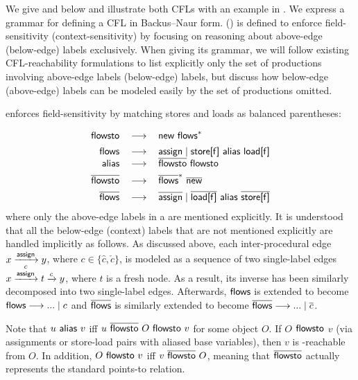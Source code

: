 We give \manuLF and \manuLC below  and illustrate both CFLs with an example in
. We express a
grammar for defining a CFL
in Backus–Naur form. 
\manuLF (\manuLC) is defined to enforce field-sensitivity (context-sensitivity)
by focusing on
reasoning about  above-edge
(below-edge) labels exclusively. When giving its grammar, we will follow  
existing 
CFL-reachability formulations 
\cite{sridharan2006refinement,shang2012demand,yan2011demand} to 
list explicitly only  the set of
productions involving 
 above-edge labels (below-edge) labels, but discuss
 how  below-edge (above-edge) labels can be modeled easily by  
 the set of productions omitted.

\manuLF 
enforces field-sensitivity   by matching  stores and loads 
 as  balanced parentheses:

\begin{equation}
\label{eqn:callsiteLF}
\begin{tabular}{rcl}
$\flowsto$ & $\longrightarrow$ & $\new ~ \flows^*$ \\[1ex]
$\flows$ & $\longrightarrow$ & $\assign \mid  \storefield{f} \ \alias \ \loadfield{f}$\\
$\alias$ & $\longrightarrow$ & $\iflowsto\ \flowsto$ \\[1ex]
$\iflowsto$ & $\longrightarrow$ & $\iflows^* ~ \inew $\\[1ex]
$\iflows$ & $\longrightarrow$ & $\iassign \mid \iloadfield{f}\ \alias \ \istorefield{f} $
\end{tabular}
\end{equation}
where only the above-edge labels in a  \pag are mentioned explicitly. It is
understood that
all the below-edge (context) labels that are not mentioned explicitly
are handled implicitly as follows.
As discussed above, each inter-procedural \assign edge
$x\xrightarrow[c]{\textsf{assign}}y$, where $c\in \{
\hat{c}, \check{c}\}$, is modeled as a sequence of  two single-label edges
$x \xrightarrow{\textsf{assign}} t \xrightarrow{c}  y$, where $t$ is a fresh node. As a result,
its inverse has been
similarly
decomposed into two
single-label edges.
Afterwards,  $\textsf{flows}$ is extended to become $\textsf{flows} \longrightarrow ... \mid c$ and
$\overline{\textsf{flows}}$ is similarly extended to become $\overline{\textsf{flows}}  \longrightarrow ... \mid \overline{c}$.

Note that
$u\ \textsf{alias}\ v$ iff $u\ \overline{\textsf{flowsto}}\ O\ \textsf{flowsto}\ v$ for some object $O$.
If $O$ $\textsf{flowsto}$ $v$ (via   assignments or store-load pairs with
aliased base variables), then $v$ is \manuLF-reachable from $O$. In addition, $O\ \textsf{flowsto}\ v$ iff $v\ \overline{\textsf{flowsto}}\ O$,
meaning that $\overline{\textsf{flowsto}}$ actually represents the standard
 points-to relation. 

